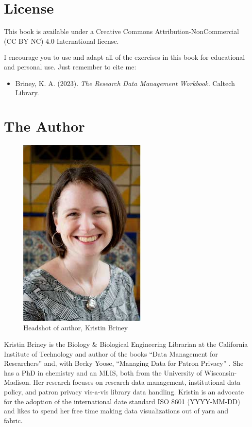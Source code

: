 \documentclass[
]{book}
\providecommand{\tightlist}{%
  \setlength{\itemsep}{0pt}\setlength{\parskip}{0pt}}
\begin{document}
\hypertarget{license}{%
\section*{License}\label{license}}

This book is available under a Creative Commons Attribution-NonCommercial (CC BY-NC) 4.0 International license.

I encourage you to use and adapt all of the exercises in this book for educational and personal use. Just remember to cite me:

\begin{itemize}
\tightlist
\item
  Briney, K. A. (2023). \emph{The Research Data Management Workbook.} Caltech Library.
\end{itemize}

\hypertarget{the-author}{%
\section*{The Author}\label{the-author}}

\begin{figure}
\centering
\includegraphics{images/00_KristinBriney.jpg}
\caption{Headshot of author, Kristin Briney}
\end{figure}

Kristin Briney is the Biology \& Biological Engineering Librarian at the California Institute of Technology and author of the books ``Data Management for Researchers'' \citep{briney_data_2015} and, with Becky Yoose, ``Managing Data for Patron Privacy'' \citep{briney_managing_2022}. She has a PhD in chemistry and an MLIS, both from the University of Wisconsin-Madison. Her research focuses on research data management, institutional data policy, and patron privacy vis-a-vis library data handling. Kristin is an advocate for the adoption of the international date standard ISO 8601 (YYYY-MM-DD) and likes to spend her free time making data visualizations out of yarn and fabric.
\end{document}
